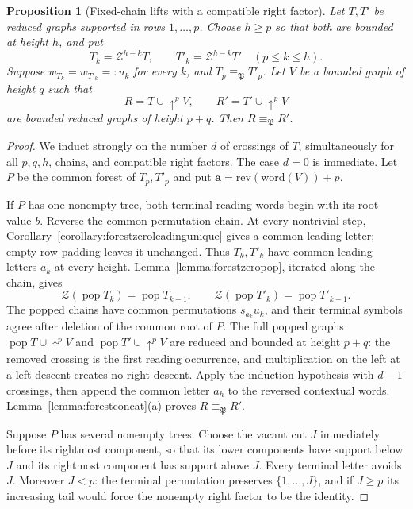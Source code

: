 \documentclass{amsart}
\newtheorem{proposition}[lemma]{Proposition}
\theoremstyle{definition}
\theoremstyle{remark}
\numberwithin{equation}{subsection}
\newcommand{\shup}{{\uparrow}}
\newcommand{\wof}[1]{w_{#1}}
\newcommand{\zeromap}{\mathcal{Z}}
\newcommand{\forest}{\mathfrak{P}}
\begin{document}
\begin{proposition}[Fixed-chain lifts with a compatible right factor]\label{proposition:forestcompatiblechain}
Let $T,T'$ be reduced graphs supported in rows $1,\ldots,p$. Choose $h\geq p$ so that both are bounded at height $h$, and put
$$T_k=\zeromap^{h-k}T,\qquad T'_k=\zeromap^{h-k}T'
\quad(p\leq k\leq h).$$
Suppose $\wof{T_k}=\wof{T'_k}=:u_k$ for every $k$, and $T_p\equiv_\forest T'_p$. Let $V$ be a bounded graph of height $q$ such that
$$R=T\cup\shup^pV,\qquad R'=T'\cup\shup^pV$$
are bounded reduced graphs of height $p+q$. Then $R\equiv_\forest R'$.
\end{proposition}
\begin{proof}
We induct strongly on the number $d$ of crossings of $T$, simultaneously for all $p,q,h$, chains, and compatible right factors. The case $d=0$ is immediate. Let $P$ be the common forest of $T_p,T'_p$ and put $\mathbf a=\mathrm{rev}(\mathrm{word}(V))+p$.

If $P$ has one nonempty tree, both terminal reading words begin with its root value $b$. Reverse the common permutation chain. At every nontrivial step, Corollary~\ref{corollary:forestzeroleadingunique} gives a common leading letter; empty-row padding leaves it unchanged. Thus $T_k,T'_k$ have common leading letters $a_k$ at every height. Lemma~\ref{lemma:forestzeropop}, iterated along the chain, gives
$$\zeromap(\operatorname{pop}T_k)=\operatorname{pop}T_{k-1},
\qquad
\zeromap(\operatorname{pop}T'_k)=\operatorname{pop}T'_{k-1}.$$
The popped chains have common permutations $s_{a_k}u_k$, and their terminal symbols agree after deletion of the common root of $P$. The full popped graphs $\operatorname{pop}T\cup\shup^pV$ and $\operatorname{pop}T'\cup\shup^pV$ are reduced and bounded at height $p+q$: the removed crossing is the first reading occurrence, and multiplication on the left at a left descent creates no right descent. Apply the induction hypothesis with $d-1$ crossings, then append the common letter $a_h$ to the reversed contextual words. Lemma~\ref{lemma:forestconcat}(a) proves $R\equiv_\forest R'$.

Suppose $P$ has several nonempty trees. Choose the vacant cut $J$ immediately before its rightmost component, so that its lower components have support below $J$ and its rightmost component has support above $J$. Every terminal letter avoids $J$. Moreover $J<p$: the terminal permutation preserves $\{1,\ldots,J\}$, and if $J\geq p$ its increasing tail would force the nonempty right factor to be the identity.


\end{proof}
\end{document}
